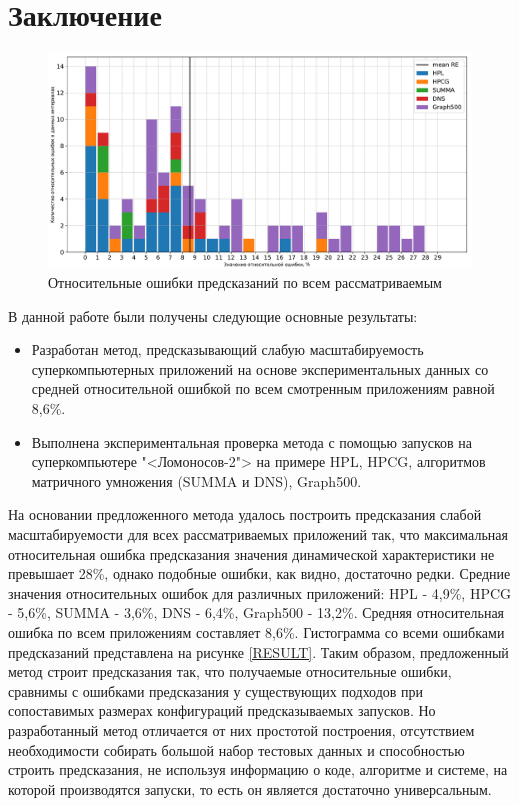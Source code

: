 \section{Заключение}
	\begin{figure}[h]
		\centering
		\includegraphics[width=\textwidth]{./images/RE_graph}
		\caption{Относительные ошибки предсказаний по всем рассматриваемым}
		\label{RESULT}
	\end{figure}
	В данной работе были получены следующие основные результаты:
	\begin{itemize}
		\item Разработан метод, предсказывающий слабую масштабируемость суперкомпьютерных приложений на основе экспериментальных данных со средней относительной ошибкой по всем смотренным приложениям равной 8,6\%.
		\item Выполнена экспериментальная проверка метода с помощью запусков на суперкомпьютере "<Ломоносов-2"> на примере HPL, HPCG, алгоритмов матричного умножения (SUMMA и DNS), Graph500.
	\end{itemize}

	На основании предложенного метода удалось построить предсказания слабой масштабируемости для всех рассматриваемых приложений так, что максимальная относительная ошибка предсказания значения динамической характеристики не превышает 28\%, однако подобные ошибки, как видно, достаточно редки. Средние значения относительных ошибок для различных приложений: HPL - 4,9\%, HPCG - 5,6\%, SUMMA - 3,6\%, DNS - 6,4\%, Graph500 - 13,2\%. Средняя относительная ошибка по всем приложениям составляет 8,6\%. Гистограмма со всеми ошибками предсказаний представлена на рисунке \eqref{RESULT}. Таким образом, предложенный метод строит предсказания так, что получаемые относительные ошибки, сравнимы с ошибками предсказания у существующих подходов при сопоставимых размерах конфигураций предсказываемых запусков. Но разработанный метод отличается от них простотой построения, отсутствием необходимости собирать большой набор тестовых данных и способностью строить предсказания, не используя информацию о коде, алгоритме и системе, на которой производятся запуски, то есть он является достаточно универсальным.
	
\clearpage
